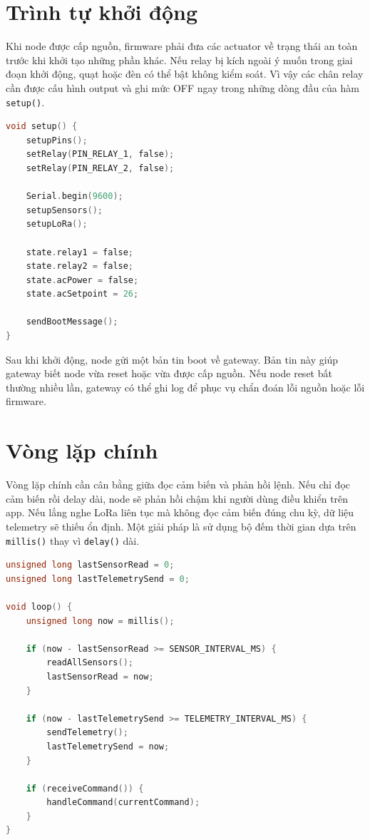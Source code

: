 \section{Trình tự khởi động}
Khi node được cấp nguồn, firmware phải đưa các actuator về trạng thái an toàn trước khi khởi tạo những phần khác. Nếu relay bị kích ngoài ý muốn trong giai đoạn khởi động, quạt hoặc đèn có thể bật không kiểm soát. Vì vậy các chân relay cần được cấu hình output và ghi mức OFF ngay trong những dòng đầu của hàm \texttt{setup()}.

\begin{lstlisting}[language=C,caption={Trình tự khởi động đề xuất cho node}]
void setup() {
    setupPins();
    setRelay(PIN_RELAY_1, false);
    setRelay(PIN_RELAY_2, false);

    Serial.begin(9600);
    setupSensors();
    setupLoRa();

    state.relay1 = false;
    state.relay2 = false;
    state.acPower = false;
    state.acSetpoint = 26;

    sendBootMessage();
}
\end{lstlisting}

Sau khi khởi động, node gửi một bản tin boot về gateway. Bản tin này giúp gateway biết node vừa reset hoặc vừa được cấp nguồn. Nếu node reset bất thường nhiều lần, gateway có thể ghi log để phục vụ chẩn đoán lỗi nguồn hoặc lỗi firmware.

\section{Vòng lặp chính}
Vòng lặp chính cần cân bằng giữa đọc cảm biến và phản hồi lệnh. Nếu chỉ đọc cảm biến rồi delay dài, node sẽ phản hồi chậm khi người dùng điều khiển trên app. Nếu lắng nghe LoRa liên tục mà không đọc cảm biến đúng chu kỳ, dữ liệu telemetry sẽ thiếu ổn định. Một giải pháp là sử dụng bộ đếm thời gian dựa trên \texttt{millis()} thay vì \texttt{delay()} dài.

\begin{lstlisting}[language=C,caption={Vòng lặp chính không chặn}]
unsigned long lastSensorRead = 0;
unsigned long lastTelemetrySend = 0;

void loop() {
    unsigned long now = millis();

    if (now - lastSensorRead >= SENSOR_INTERVAL_MS) {
        readAllSensors();
        lastSensorRead = now;
    }

    if (now - lastTelemetrySend >= TELEMETRY_INTERVAL_MS) {
        sendTelemetry();
        lastTelemetrySend = now;
    }

    if (receiveCommand()) {
        handleCommand(currentCommand);
    }
}
\end{lstlisting}

